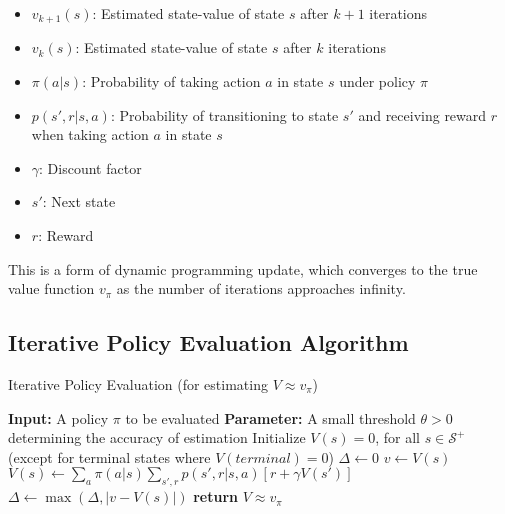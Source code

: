 \documentclass{article}
\begin{document}
\begin{tcolorbox}[colframe=blue!50!black, colback=blue!10, title=Notation Overview]
\begin{itemize}
    \item $v_{k+1}(s)$: Estimated state-value of state $s$ after $k+1$ iterations
    \item $v_k(s)$: Estimated state-value of state $s$ after $k$ iterations
    \item $\pi(a|s)$: Probability of taking action $a$ in state $s$ under policy $\pi$
    \item $p(s',r|s,a)$: Probability of transitioning to state $s'$ and receiving reward $r$ when taking action $a$ in state $s$
    \item $\gamma$: Discount factor
    \item $s'$: Next state
    \item $r$: Reward
\end{itemize}
\end{tcolorbox}

This is a form of dynamic programming update, which converges to the true value function $v_\pi$ as the number of iterations approaches infinity.

\subsection{Iterative Policy Evaluation Algorithm}

\begin{algorithm}
\caption{Iterative Policy Evaluation (for estimating $V \approx v_\pi$)}
\begin{algorithmic}[1]
\State \textbf{Input:} A policy $\pi$ to be evaluated
\State \textbf{Parameter:} A small threshold $\theta > 0$ determining the accuracy of estimation
\State Initialize $V(s) = 0$, for all $s \in \mathcal{S}^+$ (except for terminal states where $V(terminal) = 0$)
\Repeat
\State $\Delta \gets 0$
\State $v \gets V(s)$
\State $V(s) \gets \sum_a \pi(a|s) \sum_{s',r} p(s',r|s,a)[r + \gamma V(s')]$
\State $\Delta \gets \max(\Delta, |v - V(s)|)$
\EndFor
\Until{$\Delta < \theta$}
\State \textbf{return} $V \approx v_\pi$
\end{algorithmic}
\end{algorithm}
\end{document}
